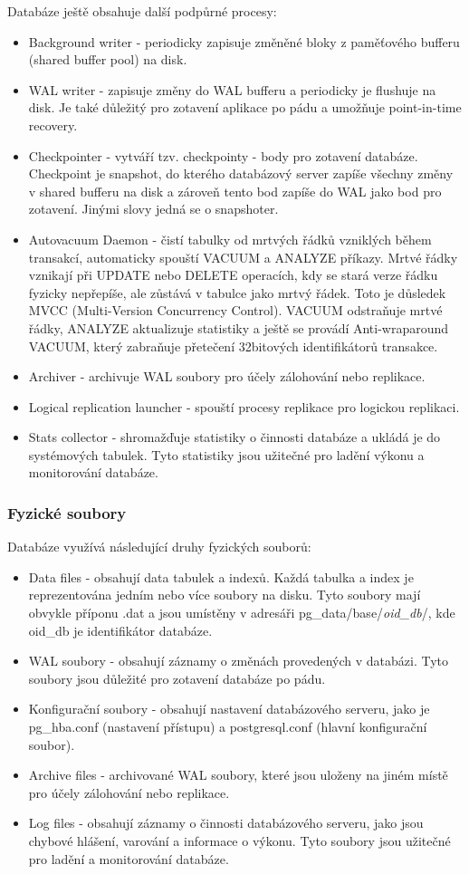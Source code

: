 Databáze ještě obsahuje další podpůrné procesy:
\begin{itemize}
  \item Background writer - periodicky zapisuje změněné bloky z paměťového bufferu (shared buffer pool) na disk.
  \item WAL writer - zapisuje změny do WAL bufferu a periodicky je flushuje na disk. Je také důležitý pro zotavení aplikace po pádu a umožňuje point-in-time recovery.
  \item Checkpointer - vytváří tzv. checkpointy - body pro zotavení databáze. Checkpoint je snapshot, do kterého databázový server zapíše všechny změny v shared bufferu na disk a zároveň tento bod zapíše do WAL jako bod pro zotavení. Jinými slovy jedná se o snapshoter.
  \item Autovacuum Daemon - čistí tabulky od mrtvých řádků vzniklých během transakcí, automaticky spouští VACUUM a ANALYZE příkazy. Mrtvé řádky vznikají při UPDATE nebo DELETE operacích, kdy se stará verze řádku fyzicky nepřepíše, ale zůstává v tabulce jako mrtvý řádek. Toto je důsledek MVCC (Multi-Version Concurrency Control). VACUUM odstraňuje mrtvé řádky, ANALYZE aktualizuje statistiky a ještě se provádí Anti-wraparound VACUUM, který zabraňuje přetečení 32bitových identifikátorů transakce.
  \item Archiver - archivuje WAL soubory pro účely zálohování nebo replikace.
  \item Logical replication launcher - spouští procesy replikace pro logickou replikaci.
    \item Stats collector - shromažďuje statistiky o činnosti databáze a ukládá je do systémových tabulek. Tyto statistiky jsou užitečné pro ladění výkonu a monitorování databáze.
\end{itemize}

\subsubsection{Fyzické soubory}
Databáze využívá následující druhy fyzických souborů:
\begin{itemize}
    \item Data files - obsahují data tabulek a indexů. Každá tabulka a index je reprezentována jedním nebo více soubory na disku. Tyto soubory mají obvykle příponu .dat a jsou umístěny v adresáři pg\_data/base/\textit{oid\_db}/, kde oid\_db je identifikátor databáze.
  \item WAL soubory - obsahují záznamy o změnách provedených v databázi. Tyto soubory jsou důležité pro zotavení databáze po pádu.
  \item Konfigurační soubory - obsahují nastavení databázového serveru, jako je pg\_hba.conf (nastavení přístupu) a postgresql.conf (hlavní konfigurační soubor).
  \item Archive files - archivované WAL soubory, které jsou uloženy na jiném místě pro účely zálohování nebo replikace.
    \item Log files - obsahují záznamy o činnosti databázového serveru, jako jsou chybové hlášení, varování a informace o výkonu. Tyto soubory jsou užitečné pro ladění a monitorování databáze.
\end{itemize}


